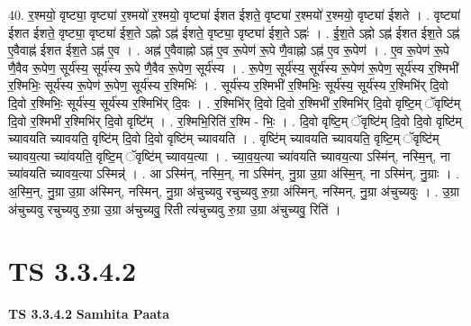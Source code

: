 \documentclass[17pt]{extarticle}
\begin{document}
40. र॒श्मयो॒ वृष्ट्या॒ वृष्ट्या॑ र॒श्मयो॑ र॒श्मयो॒ वृष्ट्या॑ ईशत ईशते॒ वृष्ट्या॑ र॒श्मयो॑ र॒श्मयो॒ वृष्ट्या॑ ईशते । . वृष्ट्या॑ ईशत ईशते॒ वृष्ट्या॒ वृष्ट्या॑ ईश॒ते ऽह्नो ऽह्न॑ ईशते॒ वृष्ट्या॒ वृष्ट्या॑ ईश॒ते ऽह्नः॑ । . ई॒श॒ते ऽह्नो ऽह्न॑ ईशत ईश॒ते ऽह्न॑ ए॒वैवाह्न॑ ईशत ईश॒ते ऽह्न॑ ए॒व । . अह्न॑ ए॒वैवाह्नो ऽह्न॑ ए॒व रू॒पेण॑ रू॒पे णै॒वाह्नो ऽह्न॑ ए॒व रू॒पेण॑ । . ए॒व रू॒पेण॑ रू॒पे णै॒वैव रू॒पेण॒ सूर्य॑स्य॒ सूर्य॑स्य रू॒पे णै॒वैव रू॒पेण॒ सूर्य॑स्य । . रू॒पेण॒ सूर्य॑स्य॒ सूर्य॑स्य रू॒पेण॑ रू॒पेण॒ सूर्य॑स्य र॒श्मिभी॑ र॒श्मिभिः॒ सूर्य॑स्य रू॒पेण॑ रू॒पेण॒ सूर्य॑स्य र॒श्मिभिः॑ । . सूर्य॑स्य र॒श्मिभी॑ र॒श्मिभिः॒ सूर्य॑स्य॒ सूर्य॑स्य र॒श्मिभि॑र् दि॒वो दि॒वो र॒श्मिभिः॒ सूर्य॑स्य॒ सूर्य॑स्य र॒श्मिभि॑र् दि॒वः । . र॒श्मिभि॑र् दि॒वो दि॒वो र॒श्मिभी॑ र॒श्मिभि॑र् दि॒वो वृष्टि॒म् ॅवृष्टि॑म् दि॒वो र॒श्मिभी॑ र॒श्मिभि॑र् दि॒वो वृष्टि᳚म् । . र॒श्मिभि॒रिति॑ र॒श्मि - भिः॒ । . दि॒वो वृष्टि॒म् ॅवृष्टि॑म् दि॒वो दि॒वो वृष्टि॑म् च्यावयति च्यावयति॒ वृष्टि॑म् दि॒वो दि॒वो वृष्टि॑म् च्यावयति । . वृष्टि॑म् च्यावयति च्यावयति॒ वृष्टि॒म् ॅवृष्टि॑म् च्यावय॒त्या च्या॑वयति॒ वृष्टि॒म् ॅवृष्टि॑म् च्यावय॒त्या । . च्या॒व॒य॒त्या च्या॑वयति च्यावय॒त्या ऽस्मि॑न्, नस्मि॒न्, ना च्या॑वयति च्यावय॒त्या ऽस्मिन्न्॑ । . आ ऽस्मि॑न्, नस्मि॒न्, ना ऽस्मि॑न्, नु॒ग्रा उ॒ग्रा अ॑स्मि॒न्, ना ऽस्मि॑न्, नु॒ग्राः । . अ॒स्मि॒न्, नु॒ग्रा उ॒ग्रा अ॑स्मिन्, नस्मिन्, नु॒ग्रा अ॑चुच्यवु रचुच्यवु रु॒ग्रा अ॑स्मिन्, नस्मिन्, नु॒ग्रा अ॑चुच्यवुः । . उ॒ग्रा अ॑चुच्यवु रचुच्यवु रु॒ग्रा उ॒ग्रा अ॑चुच्यवु॒ रिती त्य॑चुच्यवु रु॒ग्रा उ॒ग्रा अ॑चुच्यवु॒ रिति॑ । \newline
\pagebreak
{}

\section{ TS 3.3.4.2 }

\textbf{TS 3.3.4.2 } \newline
\textbf{Samhita Paata} \newline
\end{document}
